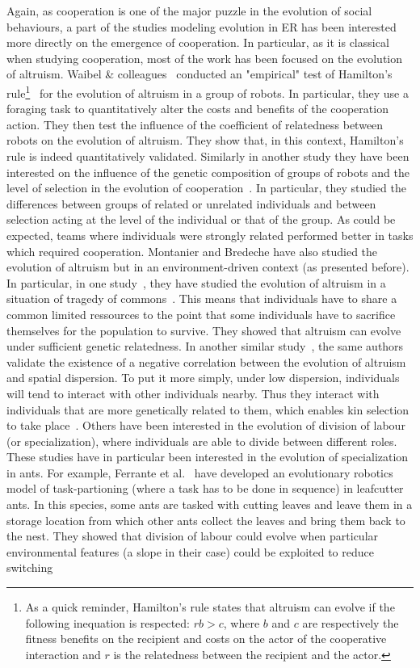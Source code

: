     Again, as cooperation is one of the major puzzle in the evolution of social behaviours, a part of the studies modeling evolution in ER has been interested more directly on the emergence of cooperation. In particular, as it is classical when studying cooperation, most of the work has been focused on the evolution of altruism. Waibel \& colleagues~\parencite{Waibel2011} conducted an "empirical" test of Hamilton's rule\footnote{As a quick reminder, Hamilton's rule states that altruism can evolve if the following inequation is respected: $rb > c$, where $b$ and $c$ are respectively the fitness benefits on the recipient and costs on the actor of the cooperative interaction and $r$ is the relatedness between the recipient and the actor.}~\parencite{Hamilton1964} for the evolution of altruism in a group of robots. In particular, they use a foraging task to quantitatively alter the costs and benefits of the cooperation action. They then test the influence of the coefficient of relatedness between robots on the evolution of altruism. They show that, in this context, Hamilton's rule is indeed quantitatively validated. Similarly in another study they have been interested on the influence of the genetic composition of groups of robots and the level of selection in the evolution of cooperation~\parencite{Waibel2009}. In particular, they studied the differences between groups of related or unrelated individuals and between selection acting at the level of the individual or that of the group. As could be expected, teams where individuals were strongly related performed better in tasks which required cooperation. Montanier and Bredeche have also studied the evolution of altruism but in an environment-driven context (as presented before). In particular, in one study~\parencite{Montanier2011}, they have studied the evolution of altruism in a situation of tragedy of commons~\parencite{Hardin1968}. This means that individuals have to share a common limited ressources to the point that some individuals have to sacrifice themselves for the population to survive. They showed that altruism can evolve under sufficient genetic relatedness. In another similar study~\parencite{Montanier2013}, the same authors validate the existence of a negative correlation between the evolution of altruism and spatial dispersion. To put it more simply, under low dispersion, individuals will tend to interact with other individuals nearby. Thus they interact with individuals that are more genetically related to them, which enables kin selection to take place~\parencite{VanBaalen1998}. Others have been interested in the evolution of division of labour (or specialization), where individuals are able to divide between different roles. These studies have in particular been interested in the evolution of specialization in ants. For example, Ferrante et al.~\parencite{Ferrante2015} have developed an evolutionary robotics model of task-partioning (where a task has to be done in sequence) in leafcutter ants. In this species, some ants are tasked with cutting leaves and leave them in a storage location from which other ants collect the leaves and bring them back to the nest. They showed that division of labour could evolve when particular environmental features (a slope in their case) could be exploited to reduce switching 